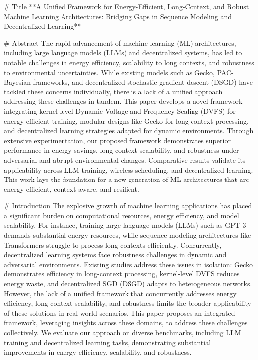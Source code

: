 # Title  
**A Unified Framework for Energy-Efficient, Long-Context, and Robust Machine Learning Architectures: Bridging Gaps in Sequence Modeling and Decentralized Learning**

# Abstract  
The rapid advancement of machine learning (ML) architectures, including large language models (LLMs) and decentralized systems, has led to notable challenges in energy efficiency, scalability to long contexts, and robustness to environmental uncertainties. While existing models such as Gecko, PAC-Bayesian frameworks, and decentralized stochastic gradient descent (DSGD) have tackled these concerns individually, there is a lack of a unified approach addressing these challenges in tandem. This paper develops a novel framework integrating kernel-level Dynamic Voltage and Frequency Scaling (DVFS) for energy-efficient training, modular designs like Gecko for long-context processing, and decentralized learning strategies adapted for dynamic environments. Through extensive experimentation, our proposed framework demonstrates superior performance in energy savings, long-context scalability, and robustness under adversarial and abrupt environmental changes. Comparative results validate its applicability across LLM training, wireless scheduling, and decentralized learning. This work lays the foundation for a new generation of ML architectures that are energy-efficient, context-aware, and resilient.

# Introduction  
The explosive growth of machine learning applications has placed a significant burden on computational resources, energy efficiency, and model scalability. For instance, training large language models (LLMs) such as GPT-3 demands substantial energy resources, while sequence modeling architectures like Transformers struggle to process long contexts efficiently. Concurrently, decentralized learning systems face robustness challenges in dynamic and adversarial environments. Existing studies address these issues in isolation: Gecko demonstrates efficiency in long-context processing, kernel-level DVFS reduces energy waste, and decentralized SGD (DSGD) adapts to heterogeneous networks. However, the lack of a unified framework that concurrently addresses energy efficiency, long-context scalability, and robustness limits the broader applicability of these solutions in real-world scenarios.  
This paper proposes an integrated framework, leveraging insights across these domains, to address these challenges collectively. We evaluate our approach on diverse benchmarks, including LLM training and decentralized learning tasks, demonstrating substantial improvements in energy efficiency, scalability, and robustness.

